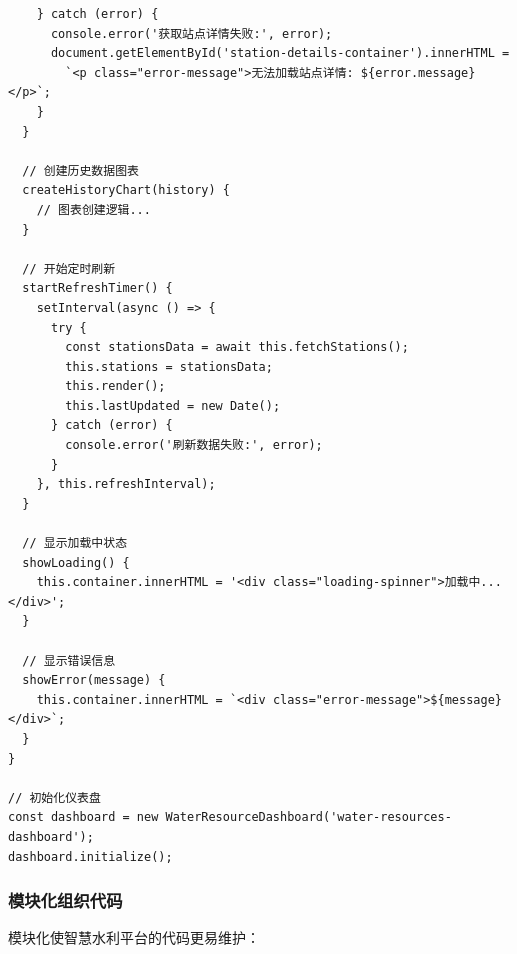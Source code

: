\begin{lstlisting}
    } catch (error) {
      console.error('获取站点详情失败:', error);
      document.getElementById('station-details-container').innerHTML = 
        `<p class="error-message">无法加载站点详情: ${error.message}</p>`;
    }
  }
  
  // 创建历史数据图表
  createHistoryChart(history) {
    // 图表创建逻辑...
  }
  
  // 开始定时刷新
  startRefreshTimer() {
    setInterval(async () => {
      try {
        const stationsData = await this.fetchStations();
        this.stations = stationsData;
        this.render();
        this.lastUpdated = new Date();
      } catch (error) {
        console.error('刷新数据失败:', error);
      }
    }, this.refreshInterval);
  }
  
  // 显示加载中状态
  showLoading() {
    this.container.innerHTML = '<div class="loading-spinner">加载中...</div>';
  }
  
  // 显示错误信息
  showError(message) {
    this.container.innerHTML = `<div class="error-message">${message}</div>`;
  }
}

// 初始化仪表盘
const dashboard = new WaterResourceDashboard('water-resources-dashboard');
dashboard.initialize();
\end{lstlisting}

\subsubsection{模块化组织代码}\label{ux6a21ux5757ux5316ux7ec4ux7ec7ux4ee3ux7801}

模块化使智慧水利平台的代码更易维护：

